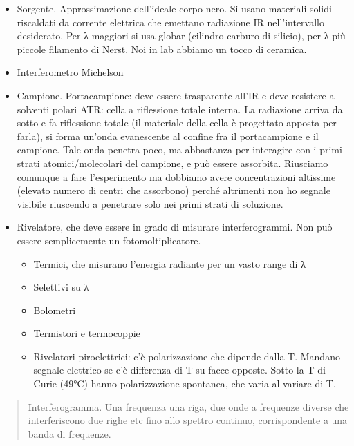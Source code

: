 \begin{itemize}
\item
  Sorgente. Approssimazione dell'ideale corpo nero. Si usano materiali
  solidi riscaldati da corrente elettrica che emettano radiazione IR
  nell'intervallo desiderato. Per λ maggiori si usa globar (cilindro
  carburo di silicio), per λ più piccole filamento di Nerst. Noi in lab
  abbiamo un tocco di ceramica.
\item
  Interferometro Michelson
\item
  Campione. Portacampione: deve essere trasparente all'IR e deve
  resistere a solventi polari ATR: cella a riflessione totale interna.
  La radiazione arriva da sotto e fa riflessione totale (il materiale
  della cella è progettato apposta per farla), si forma un'onda
  evanescente al confine fra il portacampione e il campione. Tale onda
  penetra poco, ma abbastanza per interagire con i primi strati
  atomici/molecolari del campione, e può essere assorbita. Riusciamo
  comunque a fare l'esperimento ma dobbiamo avere concentrazioni
  altissime (elevato numero di centri che assorbono) perché altrimenti
  non ho segnale visibile riuscendo a penetrare solo nei primi strati di
  soluzione.
\item
  Rivelatore, che deve essere in grado di misurare interferogrammi. Non
  può essere semplicemente un fotomoltiplicatore.

  \begin{itemize}
  \item
    Termici, che misurano l'energia radiante per un vasto range di λ
  \item
    Selettivi su λ
  \end{itemize}

  \begin{itemize}
  \item
    Bolometri
  \item
    Termistori e termocoppie
  \item
    Rivelatori piroelettrici: c'è polarizzazione che dipende dalla T.
    Mandano segnale elettrico se c'è differenza di T su facce opposte.
    Sotto la T di Curie (49°C) hanno polarizzazione spontanea, che varia
    al variare di T.
  \end{itemize}
\end{itemize}

\begin{quote}
Interferogramma. Una frequenza una riga, due onde a frequenze diverse
che interferiscono due righe etc fino allo spettro continuo,
corrispondente a una banda di frequenze.
\end{quote}

